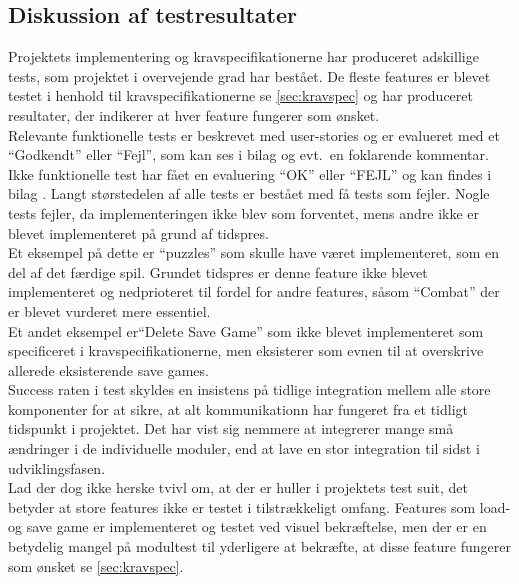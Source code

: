 \newpage
\subsection{Diskussion af testresultater}
Projektets implementering og kravspecifikationerne har produceret adskillige tests, som 
projektet i overvejende grad har bestået. De fleste features er blevet
testet i henhold til kravspecifikationerne se \autoref{sec:kravspec} og har produceret 
resultater, der indikerer at hver feature fungerer som ønsket. \\

\noindent Relevante funktionelle tests er beskrevet med user-stories og er evalueret med et ``Godkendt''
eller ``Fejl'', som kan ses i bilag \parencite[][Section 12.1]{TekniskBilag} og evt.\ en foklarende kommentar. 
Ikke funktionelle 
test har fået en evaluering ``OK'' eller ``FEJL'' og kan findes i bilag \parencite[][Section 12.2]{TekniskBilag}.
Langt størstedelen af alle tests er bestået med få tests som fejler. 
Nogle tests fejler, da implementeringen ikke blev som forventet, mens andre ikke er blevet 
implementeret på grund af tidspres. \\

\noindent Et eksempel på dette er ``puzzles'' som skulle have været implementeret, som en del af det færdige spil.
Grundet tidspres er denne feature ikke blevet implementeret og
nedprioteret til fordel for andre features, såsom ``Combat'' der er blevet vurderet mere essentiel.\\

\noindent Et andet eksempel er``Delete Save Game'' som ikke blevet implementeret som specificeret i kravspecifikationerne, men
eksisterer som evnen til at overskrive allerede eksisterende save games.\\
Success raten i test skyldes en insistens på tidlige integration mellem alle store komponenter for at sikre, at 
alt kommunikationn har fungeret fra et tidligt 
tidspunkt i projektet. Det har vist sig nemmere at integrerer mange små ændringer i de individuelle moduler, end at lave en stor integration til sidst i udviklingsfasen.\\

\noindent Lad der dog ikke herske tvivl om, at der er huller i projektets test suit, det
betyder at store features ikke er testet i tilstrækkeligt omfang. Features som load- og save game er implementeret og testet ved visuel bekræftelse, men der er en betydelig mangel på modultest til yderligere at bekræfte, at disse feature fungerer som ønsket se \autoref{sec:kravspec}. \\

\newpage
